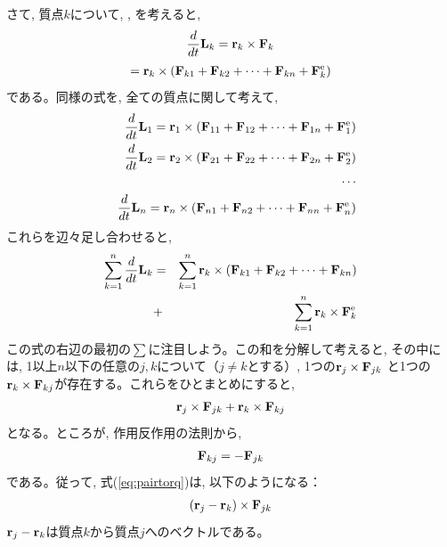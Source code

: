 さて, 質点$k$について, , を考えると, 
\begin{eqnarray}\frac{d}{dt}{\bf L}_k={\bf r}_k\times{\bf F}_k\end{eqnarray}
\begin{eqnarray} 
={\bf r}_k\times({\bf F}_{k1}+{\bf F}_{k2}+\cdots+{\bf F}_{kn}+{\bf F}_{k}^{\text{e}})
\end{eqnarray} 
である。同様の式を, 全ての質点に関して考えて, 
\begin{eqnarray*}
&&\frac{d}{dt}{\bf L}_1={\bf r}_1\times({\bf F}_{11}+{\bf F}_{12}+\cdots+{\bf F}_{1n}+{\bf F}_{1}^{\text{e}})\\
&&\frac{d}{dt}{\bf L}_2={\bf r}_2\times({\bf F}_{21}+{\bf F}_{22}+\cdots+{\bf F}_{2n}+{\bf F}_{2}^{\text{e}})\\
&&\cdots\\
&&\frac{d}{dt}{\bf L}_n={\bf r}_n\times({\bf F}_{n1}+{\bf F}_{n2}+\cdots+{\bf F}_{nn}+{\bf F}_{n}^{\text{e}})
\end{eqnarray*}
これらを辺々足し合わせると, 
\begin{eqnarray}
\sum_{k=1}^n \frac{d}{dt}{\bf L}_k
&=&\sum_{k=1}^n{\bf r}_k\times({\bf F}_{k1}+{\bf F}_{k2}+\cdots+{\bf F}_{kn})\nonumber\\
&+&\sum_{k=1}^n{\bf r}_k\times{\bf F}_{k}^{\text{e}}
\label{eq:totangmomtorq0}
\end{eqnarray}
この式の右辺の最初の$\sum$に注目しよう。この和を分解して考えると, その中には, 
1以上$n$以下の任意の$j, k$について（$j\ne k$とする）, 1つの${\bf r}_j\times{\bf F}_{jk}$
と1つの${\bf r}_k\times{\bf F}_{kj}$が存在する。これらをひとまとめにすると, 
\begin{eqnarray} 
{\bf r}_j\times{\bf F}_{jk}+{\bf r}_k\times{\bf F}_{kj}\label{eq:pairtorq}
\end{eqnarray} 
となる。ところが, 作用反作用の法則から, 
\begin{eqnarray} 
{\bf F}_{kj}=-{\bf F}_{jk}\label{eq:actreact}
\end{eqnarray} 
である。従って, 式(\ref{eq:pairtorq})は, 以下のようになる：
\begin{eqnarray} 
({\bf r}_j-{\bf r}_k)\times{\bf F}_{jk}\label{eq:pairtorq2}
\end{eqnarray} 
${\bf r}_j-{\bf r}_k$は質点$k$から質点$j$へのベクトルである。

